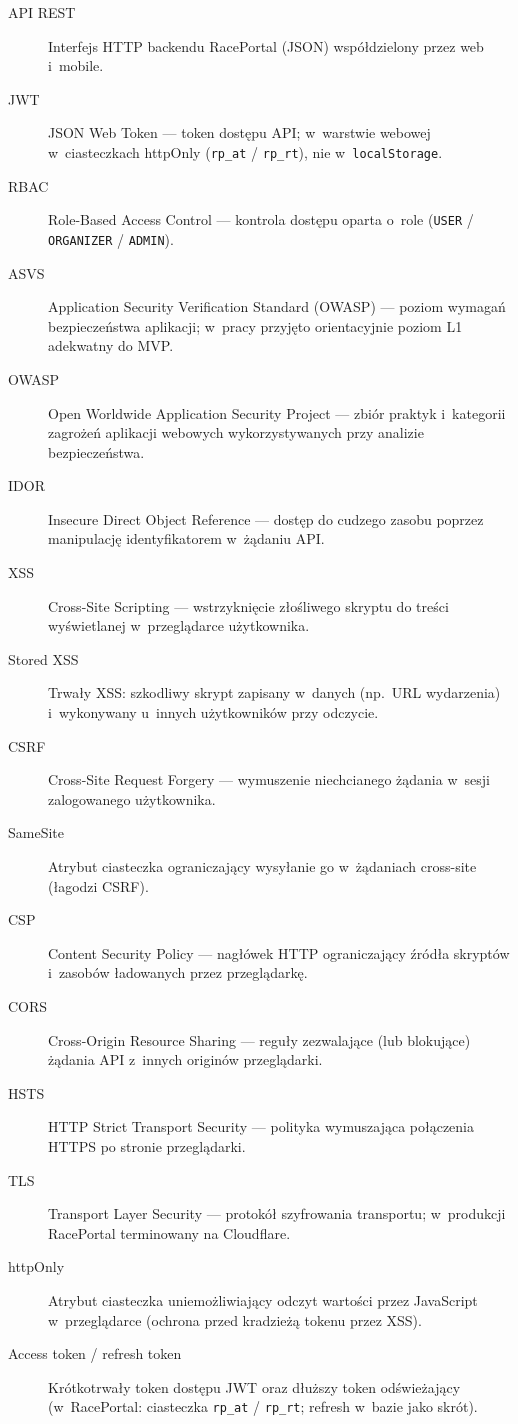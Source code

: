 \documentclass{sprz}
\begin{document}
\begin{description}
  \item[API REST] Interfejs HTTP backendu RacePortal (JSON) współdzielony przez web i~mobile.
  \item[JWT] JSON Web Token --- token dostępu API; w~warstwie webowej w~ciasteczkach httpOnly (\texttt{rp\_at} / \texttt{rp\_rt}), nie w~\texttt{localStorage}.
  \item[RBAC] Role-Based Access Control --- kontrola dostępu oparta o~role (\texttt{USER} / \texttt{ORGANIZER} / \texttt{ADMIN}).
  \item[ASVS] Application Security Verification Standard (OWASP) --- poziom wymagań bezpieczeństwa aplikacji; w~pracy przyjęto orientacyjnie poziom L1 adekwatny do MVP.
  \item[OWASP] Open Worldwide Application Security Project --- zbiór praktyk i~kategorii zagrożeń aplikacji webowych wykorzystywanych przy analizie bezpieczeństwa.
  \item[IDOR] Insecure Direct Object Reference --- dostęp do cudzego zasobu poprzez manipulację identyfikatorem w~żądaniu API.
  \item[XSS] Cross-Site Scripting --- wstrzyknięcie złośliwego skryptu do treści wyświetlanej w~przeglądarce użytkownika.
  \item[Stored XSS] Trwały XSS: szkodliwy skrypt zapisany w~danych (np.\ URL wydarzenia) i~wykonywany u~innych użytkowników przy odczycie.
  \item[CSRF] Cross-Site Request Forgery --- wymuszenie niechcianego żądania w~sesji zalogowanego użytkownika.
  \item[SameSite] Atrybut ciasteczka ograniczający wysyłanie go w~żądaniach cross-site (łagodzi CSRF).
  \item[CSP] Content Security Policy --- nagłówek HTTP ograniczający źródła skryptów i~zasobów ładowanych przez przeglądarkę.
  \item[CORS] Cross-Origin Resource Sharing --- reguły zezwalające (lub blokujące) żądania API z~innych originów przeglądarki.
  \item[HSTS] HTTP Strict Transport Security --- polityka wymuszająca połączenia HTTPS po stronie przeglądarki.
  \item[TLS] Transport Layer Security --- protokół szyfrowania transportu; w~produkcji RacePortal terminowany na Cloudflare.
  \item[httpOnly] Atrybut ciasteczka uniemożliwiający odczyt wartości przez JavaScript w~przeglądarce (ochrona przed kradzieżą tokenu przez XSS).
  \item[Access token / refresh token] Krótkotrwały token dostępu JWT oraz dłuższy token odświeżający (w~RacePortal: ciasteczka \texttt{rp\_at} / \texttt{rp\_rt}; refresh w~bazie jako skrót).

\end{description}
\end{document}
